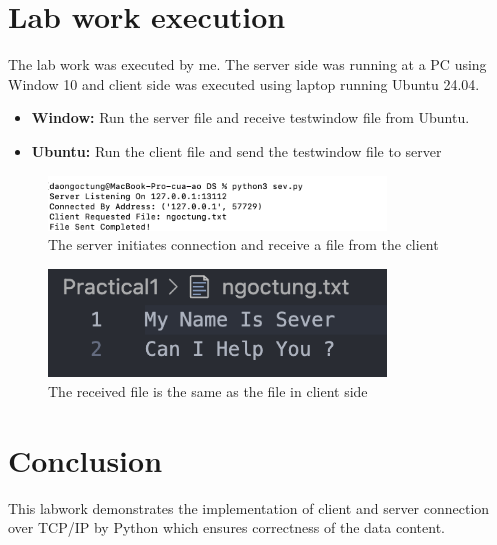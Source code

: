 \documentclass{article}
\begin{document}
\section{Lab work execution}
The lab work was executed by me. The server side was running at a PC using Window 10 and client side was executed using laptop running Ubuntu 24.04.
\begin{itemize}
    \item \textbf{Window:} Run the server file and receive testwindow file from Ubuntu.
    \item \textbf{Ubuntu:} Run the client file and send the testwindow file to server 
\end{itemize}

\begin{figure}[h!]
    \centering
    \includegraphics[width=0.8\textwidth]{sev.png}
    \caption{The server initiates connection and receive a file from the client}
    \label{fig:client}
\end{figure}

\begin{figure}[h!]
    \centering
    \includegraphics[width=0.8\textwidth]{ngoctungtxt.png}
    \caption{The received file is the same as the file in client side}
    \label{fig:client}
\end{figure}



\section{Conclusion}
This labwork demonstrates the implementation of client and server connection over TCP/IP by Python which ensures correctness of the data content.
\end{document}

